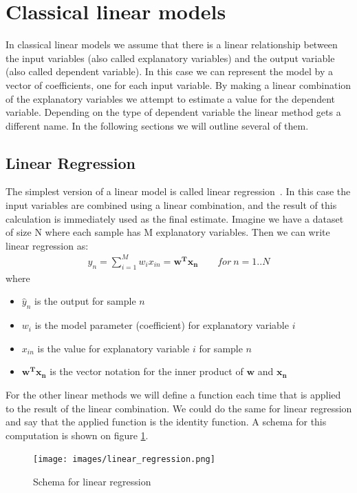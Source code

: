 \section{Classical linear models}
\label{sec:glm-classicallinearmodels}
In classical linear models we assume that there is a linear relationship between the input variables (also called explanatory variables) and the output variable (also called dependent variable). In this case we can represent the model by a vector of coefficients, one for each input variable. By making a linear combination of the explanatory variables we attempt to estimate a value for the dependent variable. Depending on the type of dependent variable the linear method gets a different name. In the following sections we will outline several of them.

\subsection{Linear Regression}
\label{subsec:glm-linear-regression}
The simplest version of a linear model is called linear regression~\cite{caltechmachinelearning}\cite{wikilinearregression}. In this case the input variables are combined using a linear combination, and the result of this calculation is immediately used as the final estimate. Imagine we have a dataset of size N where each sample has M explanatory variables. Then we can write linear regression as:\\
\begin{equation}
\begin{split}
\hat{y}_{n} = \sum_{i=1}^{M}w_{i}x_{in} = \bm{w^{T}x_{n}}   \qquad for\ n=1..N
\end{split}
\end{equation}
where
\begin{itemize}
	\item $\hat{y}_{n}$ is the output for sample $n$
	\item $w_{i}$ is the model parameter (coefficient) for explanatory variable $i$
	\item $x_{in}$ is the value for explanatory variable $i$ for sample $n$
	\item $\bm{w^{T}x_{n}}$ is the vector notation for the inner product of $\bm{w}$ and $\bm{x_{n}}$
\end{itemize}
For the other linear methods we will define a function each time that is applied to the result of the linear combination. We could do the same for linear regression and say that the applied function is the identity function. A schema for this computation is shown on figure \ref{fig:glm-linear-regression}.\\
\begin{figure}
	\centering
	\texttt{[image: images/linear\_regression.png]}
	\caption{Schema for linear regression}
	\label{fig:glm-linear-regression}
\end{figure}
